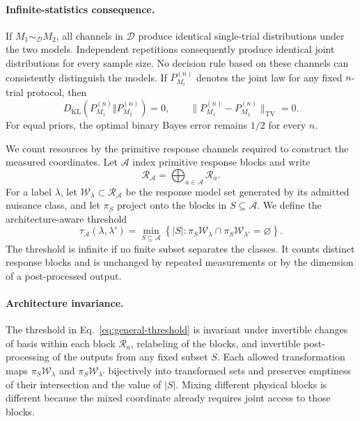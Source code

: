 \documentclass[12pt]{iopjournal}
\newcommand{\Dcal}{\mathcal D}
\newcommand{\DKL}{D_{\mathrm{KL}}}
\theoremstyle{definition}
\theoremstyle{remark}
\begin{document}
\paragraph{Infinite-statistics consequence.}
If $M_1\sim_{\Dcal}M_2$, all channels in $\Dcal$ produce identical single-trial distributions under the two models. Independent repetitions consequently produce identical joint distributions for every sample size. No decision rule based on these channels can consistently distinguish the models. If $P_{M_i}^{(n)}$ denotes the joint law for any fixed $n$-trial protocol, then
\begin{equation}
\DKL(P_{M_1}^{(n)}\Vert P_{M_2}^{(n)})=0,
\qquad
\|P_{M_1}^{(n)}-P_{M_2}^{(n)}\|_{\mathrm{TV}}=0.
\end{equation}
For equal priors, the optimal binary Bayes error remains $1/2$ for every $n$.

We count resources by the primitive response channels required to construct the measured coordinates. Let $\mathcal A$ index primitive response blocks and write
\begin{equation}
\mathcal R_{\mathcal A}=\bigoplus_{a\in\mathcal A}\mathcal R_a.
\label{eq:block-architecture}
\end{equation}
For a label $\lambda$, let $\mathcal W_\lambda\subset\mathcal R_{\mathcal A}$ be the response model set generated by its admitted nuisance class, and let $\pi_S$ project onto the blocks in $S\subseteq\mathcal A$. We define the architecture-aware threshold
\begin{equation}
\boxed{
\tau_{\mathcal A}(\lambda,\lambda')=
\min_{S\subseteq\mathcal A}
\left\{|S|:\pi_S\mathcal W_\lambda
\cap\pi_S\mathcal W_{\lambda'}=\varnothing\right\}.}
\label{eq:general-threshold}
\end{equation}
The threshold is infinite if no finite subset separates the classes. It counts distinct response blocks and is unchanged by repeated measurements or by the dimension of a post-processed output.

\paragraph{Architecture invariance.}
The threshold in Eq.~\eqref{eq:general-threshold} is invariant under invertible changes of basis within each block $\mathcal R_a$, relabeling of the blocks, and invertible post-processing of the outputs from any fixed subset $S$. Each allowed transformation maps $\pi_S\mathcal W_\lambda$ and $\pi_S\mathcal W_{\lambda'}$ bijectively into transformed sets and preserves emptiness of their intersection and the value of $|S|$. Mixing different physical blocks is different because the mixed coordinate already requires joint access to those blocks.
\end{document}
